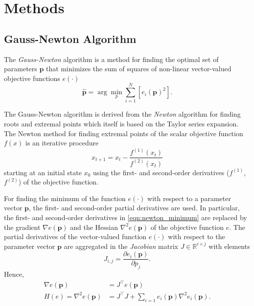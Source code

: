 \chapter{Methods}

\section{Gauss-Newton Algorithm}

The \textit{Gauss-Newton} algorithm is a method for finding the optimal set of parameters $\mathbf{p}$ that minimizes the sum of squares of non-linear vector-valued objective functions $e(\cdot)$
%
\begin{equation}
\hat{\mathbf{p}} = \arg\min_{p} \sum_{i=1}^N\left[ e_i(\mathbf{p})^2\right] .
\end{equation}

The Gauss-Newton algorithm is derived from the \textit{Newton} algorithm for finding roots and extremal points which itself is based on the Taylor series expansion. The Newton method for finding extremal points of the scalar objective function $f(x)$ is an iterative procedure
%
\begin{equation}
x_{t+1} = x_t - \frac{f^{(1)}(x_t)}{f^{(2)}(x_t)}
\label{eqn:newton_minimum}
\end{equation}
%
starting at an initial state $x_0$ using the first- and second-order derivatives ($f^{(1)}$, $f^{(2)}$) of the objective function.

For finding the minimum of the function $e(\cdot)$ with respect to a parameter vector $\mathbf{p}$, the first- and second-order partial derivatives are used. In particular, the first- and second-order derivatives in \ref{eqn:newton_minimum} are replaced by the gradient $\nabla e(\mathbf{p})$ and the Hessian $\nabla^2 e(\mathbf{p})$ of the objective function $e$.
The partial derivatives of the vector-valued function $e(\cdot)$ with respect to the parameter vector $\mathbf{p}$ are aggregated in the \textit{Jacobian} matrix $J\in \mathbb{R}^{i \times j}$ with elements
%
\begin{equation}
J_{i,j} = \frac{\partial e_i(\mathbf{p})}{\partial p_j} .
\end{equation}
%
Hence,
\begin{align}
\nabla e(\mathbf{p}) &= J^\top e(\mathbf{p}) \\
H(e) = \nabla^2 e(\mathbf{p}) &= J^\top J +  \sum_{i=1} e_i(\mathbf{p}) \nabla^2 e_i(\mathbf{p}) .
\end{align}

